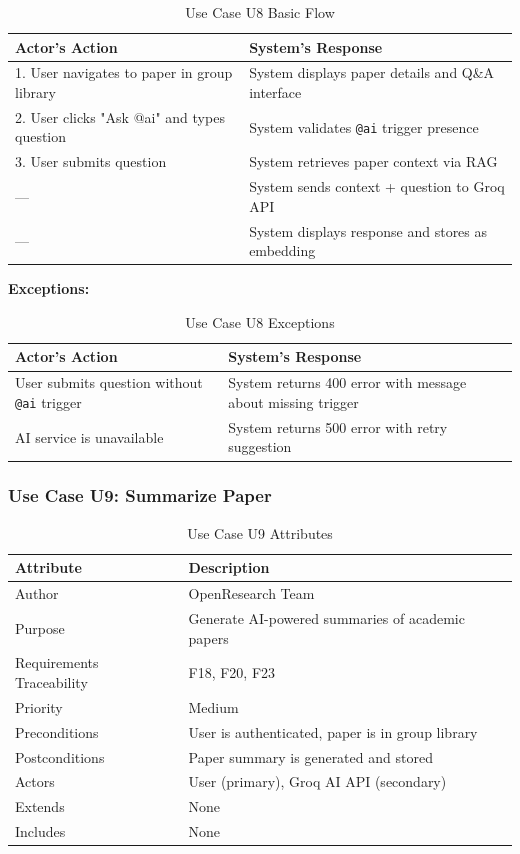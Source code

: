 \documentclass[11pt,a4paper]{article}
\begin{document}
\begin{table}[H]
\centering
\begin{tabular}{p{6cm}p{7cm}}
\toprule
\textbf{Actor's Action} & \textbf{System's Response} \\
\midrule
1. User navigates to paper in group library & System displays paper details and Q\&A interface \\
2. User clicks "Ask @ai" and types question & System validates \texttt{@ai} trigger presence \\
3. User submits question & System retrieves paper context via RAG \\
--- & System sends context + question to Groq API \\
--- & System displays response and stores as embedding \\
\bottomrule
\end{tabular}
\caption{Use Case U8 Basic Flow}
\end{table}

\textbf{Exceptions:}

\begin{table}[H]
\centering
\begin{tabular}{p{6cm}p{7cm}}
\toprule
\textbf{Actor's Action} & \textbf{System's Response} \\
\midrule
User submits question without \texttt{@ai} trigger & System returns 400 error with message about missing trigger \\
AI service is unavailable & System returns 500 error with retry suggestion \\
\bottomrule
\end{tabular}
\caption{Use Case U8 Exceptions}
\end{table}

\subsubsection{Use Case U9: Summarize Paper}

\begin{table}[H]
\centering
\begin{tabular}{p{4cm}p{9cm}}
\toprule
\textbf{Attribute} & \textbf{Description} \\
\midrule
Author & OpenResearch Team \\
Purpose & Generate AI-powered summaries of academic papers \\
Requirements Traceability & F18, F20, F23 \\
Priority & Medium \\
Preconditions & User is authenticated, paper is in group library \\
Postconditions & Paper summary is generated and stored \\
Actors & User (primary), Groq AI API (secondary) \\
Extends & None \\
Includes & None \\
\bottomrule
\end{tabular}
\caption{Use Case U9 Attributes}
\end{table}
\end{document}

